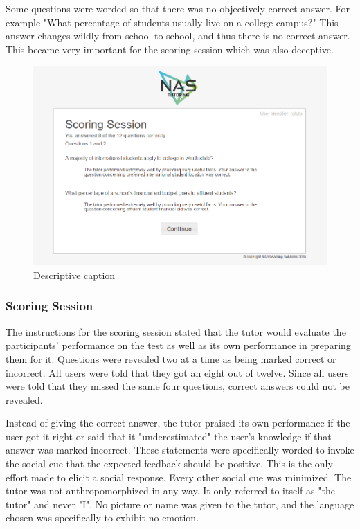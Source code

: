 \documentclass{sig-alternate-05-2015}
\begin{document}
Some questions were worded so that there was no objectively correct answer.  For example "What percentage of students usually live on a college campus?"  This answer changes wildly from school to school, and thus there is no correct answer.  This became very important for the scoring session which was also deceptive.  

\begin{figure}[!h]
    \includegraphics[width=\linewidth]{figures/website/08_scoring.png}
    \caption{Descriptive caption}
\end{figure}

\subsubsection{Scoring Session}
The instructions for the scoring session stated that the tutor would evaluate the participants' performance on the test as well as its own performance in preparing them for it.  Questions were revealed two at a time as being marked correct or incorrect.  All users were told that they got an eight out of twelve.  Since all users were told that they  missed the same four questions, correct answers could not be revealed.  

Instead of giving the correct answer, the tutor praised its own performance if the user got it right or said that it "underestimated" the user's knowledge if that answer was marked incorrect.  These statements were specifically worded to invoke the social cue that the expected feedback should be positive. This is the only effort made to elicit a social response. Every other social cue was minimized.  The tutor was not anthropomorphized in any way.  It only referred to itself as "the tutor" and never "I".  No picture or name was given to the tutor, and the language chosen was specifically to exhibit no emotion.  
\end{document}
